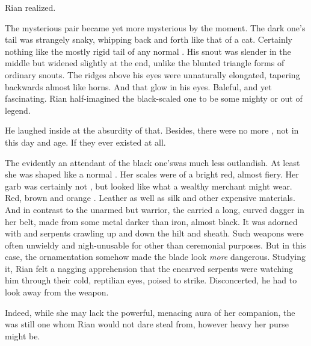 \begin{garbage}
\new
{} Rian realized. 

The mysterious pair became yet more mysterious by the moment. The dark one's tail was strangely snaky, whipping back and forth like that of a cat. Certainly nothing like the mostly rigid tail of any normal \scatha. His snout was slender in the middle but widened slightly at the end, unlike the blunted triangle forms of ordinary \scathaese{} snouts. The ridges above his eyes were unnaturally elongated, tapering backwards almost like horns. And that glow in his eyes. Baleful, and yet fascinating. Rian half-imagined the black-scaled one to be some mighty \dragon{} or \daemon{} out of legend. 

He laughed inside at the absurdity of that. 
Besides, there were no more \dragons{}, not in this day and age. 
If they ever existed at all. 

The \sphyle\dash evidently an attendant of the black one's\dash was much less outlandish. At least she was shaped like a normal \scatha. Her scales were of a bright red, almost fiery. Her garb was certainly not \Malcuric, but looked like what a wealthy \travelling merchant might wear. Red, brown and orange \colours. Leather as well as silk and other expensive materials. And in contrast to the unarmed but \armoured warrior, the \sphyle{} carried a long, curved dagger in her belt, made from some metal darker than iron, almost black. 
It was adorned with \dragons{} and serpents crawling up and down the hilt and sheath. Such weapons were often unwieldy and nigh-unusable for other than ceremonial purposes. But in this case, the ornamentation somehow made the blade look \emph{more} dangerous. %
Studying it, Rian felt a nagging apprehension that the encarved serpents were watching him through their cold, reptilian eyes, poised to strike. Disconcerted, he had to look away from the weapon. 

Indeed, while she may lack the powerful, menacing aura of her \armoured companion, the \sphyle{} was still one whom Rian would not dare steal from, however heavy her purse might be. 


\end{garbage}
